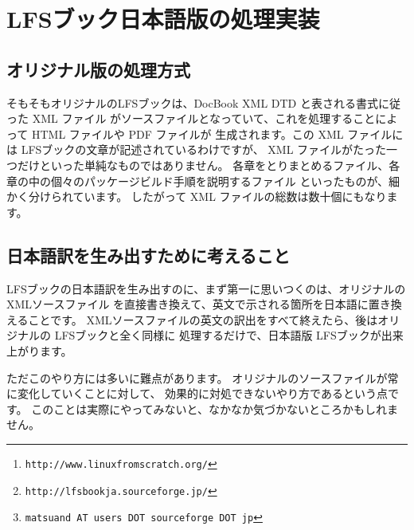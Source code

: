 \documentclass{lfsread}
\begin{document}
\author{松 山 道 夫\thanks{\texttt{matsuand AT users DOT sourceforge DOT jp}}}
\date{2013年9月xx日}
\maketitle

\begin{abstract}
Linux From Scratch は Linux を一から作り出す手順書「LFSブック」を提供するプロジェクトです%
\footnote{\texttt{http://www.linuxfromscratch.org/}}。
著者はそのオリジナルに対する日本語訳を構築し、SourceForge サイト%
\footnote{\texttt{http://lfsbookja.sourceforge.jp/}}
において公開しています。
本書では、LFSブックのこと、著者の利用状況などについてや、
日本語訳を行う際の訳出術について、
また日本語版を生成するための処理段取りなどについて、取りとめもなく語ります。
\end{abstract}

\section{LFSブック日本語版の処理実装}

\subsection{オリジナル版の処理方式}

そもそもオリジナルのLFSブックは、DocBook XML DTD と表される書式に従った XML ファイル
がソースファイルとなっていて、これを処理することによって HTML ファイルや PDF ファイルが
生成されます。この XML ファイルには LFSブックの文章が記述されているわけですが、
XML ファイルがたった一つだけといった単純なものではありません。
各章をとりまとめるファイル、各章の中の個々のパッケージビルド手順を説明するファイル
といったものが、細かく分けられています。
したがって XML ファイルの総数は数十個にもなります。

\subsection{日本語訳を生み出すために考えること}

LFSブックの日本語訳を生み出すのに、まず第一に思いつくのは、オリジナルの XMLソースファイル
を直接書き換えて、英文で示される箇所を日本語に置き換えることです。
XMLソースファイルの英文の訳出をすべて終えたら、後はオリジナルの LFSブックと全く同様に
処理するだけで、日本語版 LFSブックが出来上がります。

ただこのやり方には多いに難点があります。
オリジナルのソースファイルが常に変化していくことに対して、
効果的に対処できないやり方であるという点です。
このことは実際にやってみないと、なかなか気づかないところかもしれません。
\end{document}
